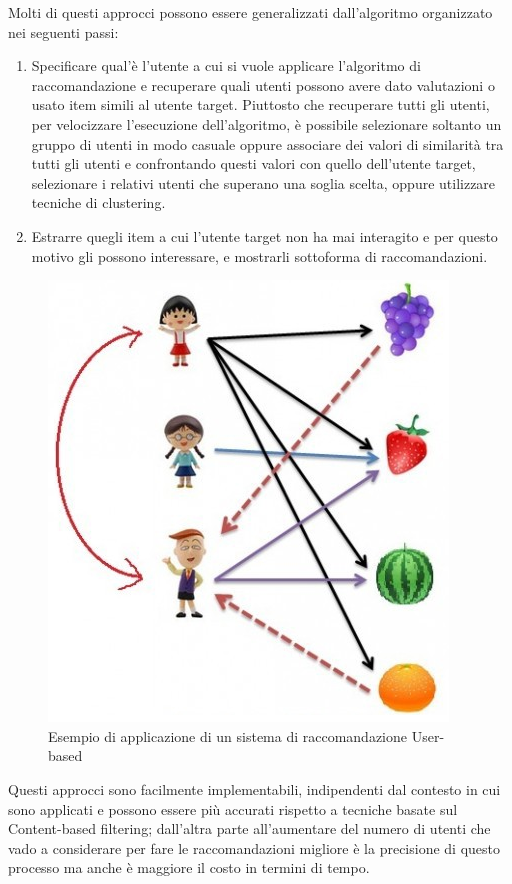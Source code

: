 Molti di questi approcci possono essere generalizzati dall'algoritmo organizzato nei seguenti passi:
\begin{enumerate}
	\item Specificare qual'è l'utente a cui si vuole applicare l'algoritmo di raccomandazione e recuperare quali utenti possono 
	avere dato valutazioni o usato item simili al utente target. Piuttosto che recuperare tutti gli utenti, per velocizzare l'esecuzione
	dell'algoritmo, è possibile selezionare soltanto un gruppo di utenti in modo casuale oppure associare dei valori di similarità tra 
	tutti gli utenti e confrontando questi valori con quello dell'utente target, selezionare i relativi utenti che superano una soglia
	scelta, oppure utilizzare tecniche di clustering.
	\item Estrarre quegli item a cui l'utente target non ha mai interagito e per questo motivo gli possono interessare, e mostrarli 
	sottoforma di raccomandazioni.
\end{enumerate}

\begin{figure}[ht!]
	\centering
	\includegraphics[scale=0.5]{images/UB_CF_ex.png}
	\caption{Esempio di applicazione di un sistema di raccomandazione User-based}
	\label{fig:UB_CF}
\end{figure}

Questi approcci sono facilmente implementabili, indipendenti dal contesto in cui sono applicati e possono essere più accurati rispetto
a tecniche basate sul Content-based filtering; dall'altra parte all'aumentare del numero di utenti che vado a considerare per fare le 
raccomandazioni migliore è la precisione di questo processo ma anche è maggiore il costo in termini di tempo.  

